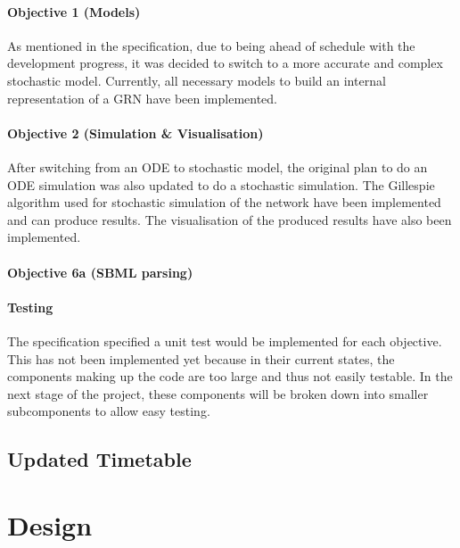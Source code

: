 \documentclass{article}
\begin{document}
	\paragraph{Objective 1 (Models)} As mentioned in the specification, due to being ahead of schedule with the development progress, it was decided to switch to a more accurate and complex stochastic model. Currently, all necessary models to build an internal representation of a GRN have been implemented.
	
	\paragraph{Objective 2 (Simulation \& Visualisation)} After switching from an ODE to stochastic model, the original plan to do an ODE simulation was also updated to do a stochastic simulation. The Gillespie algorithm used for stochastic simulation of the network have been implemented and can produce results. The visualisation of the produced results have also been implemented.
	
	\paragraph{Objective 6a (SBML parsing)} 
	
	\paragraph{Testing} The specification specified a unit test would be implemented for each objective. This has not been implemented yet because in their current states, the components making up the code are too large and thus not easily testable. In the next stage of the project, these components will be broken down into smaller subcomponents to allow easy testing.
	
	\subsection{Updated Timetable}
	
	\section{Design}		%
	
\end{document}
